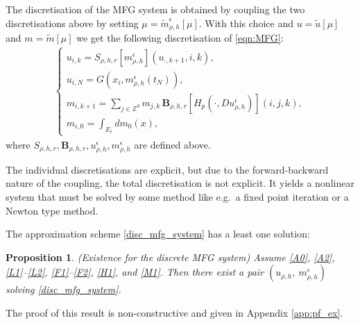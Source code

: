 \documentclass[a4paper,  twoside, 10pt, leqno]{amsart}
\newcommand{\zd}{\mathbb{Z}^d}
\newtheorem{proposition}[thm]{Proposition}
\theoremstyle{remark}
\theoremstyle{definition}
\begin{document}
\noindent 
The discretisation of the MFG system is obtained by coupling the two discretisations above by setting $\mu=\tilde m^\epsilon_{\rho,h}[\mu]$. With this choice and $u=\tilde u[\mu]$ and $m=\tilde m[\mu]$ we get the following discretisation of \eqref{eqn:MFG}:
\begin{align}\label{disc_mfg_system}
\begin{cases}
    u_{i,k} = S_{\rho,h,r} [m^\epsilon_{\rho,h}] (u_{\cdot,k+1},i,k),  \\[0.2cm]
    u_{i,N} = G (x_i, m^\epsilon_{\rho,h} (t_N)), \\[0.2cm]
    m_{i,k+1} =  \sum_{j\in \zd} m_{j,k} \, \mathbf{B}_{\rho,h,r} [ H_{p} ( \cdot, Du_{\rho,h}^{\epsilon}   ) ] ( i,j,k ), \\[0.2cm]
    m_{i,0} = \int_{E_i} dm_0(x),
\end{cases}
\end{align}
where $S_{\rho,h,r}, \mathbf{B}_{\rho,h,r}, u_{\rho,h}^{\epsilon}, m^\epsilon_{\rho,h}$ are defined above.


The individual discretisations are explicit, but due to the forward-backward nature of the coupling, the total discretisation is not explicit. It yields a nonlinear system that must be solved by some method like e.g.~a fixed point iteration or a Newton type method. 

The approximation scheme \eqref{disc_mfg_system} has a least one solution:
 
 \begin{proposition} \label{thm:existence_discrete_system}
    (Existence for the discrete MFG system) Assume
    \ref{A0}, \ref{A2}, \ref{L1}--\ref{L2}, \ref{F1}--\ref{F2}, \ref{H1}, and \ref{M1}.
    Then there exist a pair $ ( u_{\rho,h} , \ m_{\rho,h}^{\epsilon})$ 
    solving 
    \eqref{disc_mfg_system}.
\end{proposition}
The proof of this result is non-constructive and given in Appendix \ref{app:pf_ex}.

\end{document}
